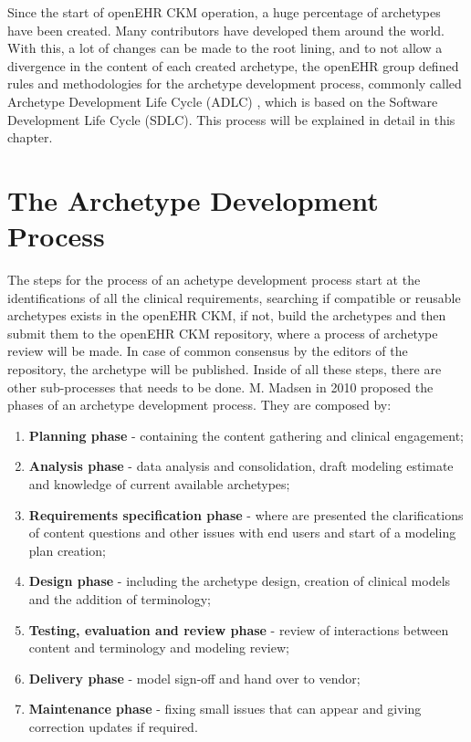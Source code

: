 \documentclass[mim_thesis.tex]{subfiles}
\begin{document}
Since the start of openEHR CKM operation, a huge percentage of archetypes have been created. Many contributors have developed them around the world. With this, a lot of changes can be made to the root lining, and to not allow a divergence in the content of each created archetype, the openEHR group defined rules and methodologies for the archetype development process, commonly called Archetype Development Life Cycle (ADLC) \citep{Madsen2010}, which is based on the Software Development Life Cycle (SDLC). This process will be explained in detail in this chapter.


\section{The Archetype Development Process}
The steps for the process of an achetype development process start at the identifications of all the clinical requirements, searching if compatible or reusable archetypes exists in the openEHR CKM, if not, build the archetypes and then submit them to the openEHR CKM repository, where a process of archetype review will be made. In case of common consensus by the editors of the repository, the archetype will be published. Inside of all these steps, there are other sub-processes that needs to be done. M. Madsen in 2010 proposed the phases of an archetype development process. They are composed by:

\begin{enumerate}[noitemsep]
\item \textbf{Planning phase} - containing the content gathering and clinical engagement;
\item \textbf{Analysis phase} - data analysis and consolidation, draft modeling estimate and knowledge of current available archetypes;
\item \textbf{Requirements specification phase} - where are presented the clarifications of content questions and other issues with end users and start of a modeling plan creation;
\item \textbf{Design phase} - including the archetype design, creation of clinical models and the addition of terminology;
\item \textbf{Testing, evaluation and review phase} - review of interactions between content and terminology and modeling review;
\item \textbf{Delivery phase} - model sign-off and hand over to vendor;
\item \textbf{Maintenance phase} - fixing small issues that can appear and giving correction updates if required.
\end{enumerate}
\end{document}
